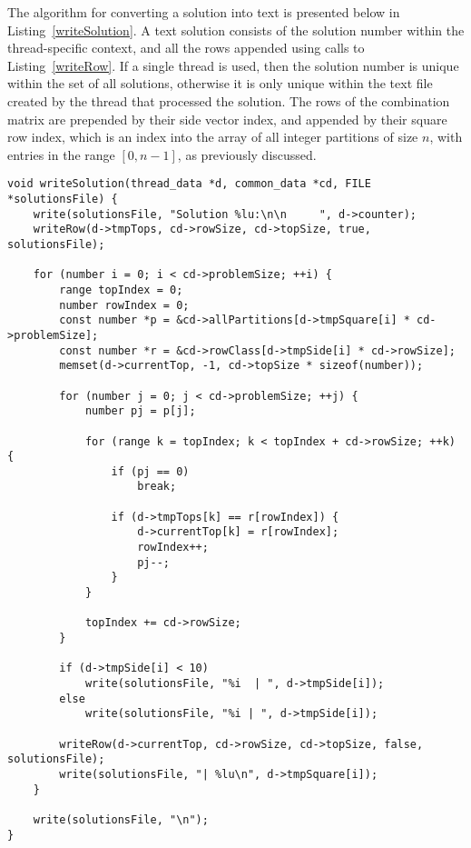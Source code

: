 The algorithm for converting a solution into text is presented below in Listing~\ref{writeSolution}. A text solution consists of the solution number within the thread-specific context, and all the rows appended using calls to Listing~\ref{writeRow}. If a single thread is used, then the solution number is unique within the set of all solutions, otherwise it is only unique within the text file created by the thread that processed the solution. The rows of the combination matrix are prepended by their side vector index, and appended by their square row index, which is an index into the array of all integer partitions of size $n$, with entries in the range $[0, n - 1]$, as previously discussed.

\begin{lstlisting}[caption={Writing an entire solution.},label={writeSolution}]
void writeSolution(thread_data *d, common_data *cd, FILE *solutionsFile) {
    write(solutionsFile, "Solution %lu:\n\n     ", d->counter);
    writeRow(d->tmpTops, cd->rowSize, cd->topSize, true, solutionsFile);

    for (number i = 0; i < cd->problemSize; ++i) {
        range topIndex = 0;
        number rowIndex = 0;
        const number *p = &cd->allPartitions[d->tmpSquare[i] * cd->problemSize];
        const number *r = &cd->rowClass[d->tmpSide[i] * cd->rowSize];
        memset(d->currentTop, -1, cd->topSize * sizeof(number));

        for (number j = 0; j < cd->problemSize; ++j) {
            number pj = p[j];

            for (range k = topIndex; k < topIndex + cd->rowSize; ++k) {
                if (pj == 0)
                    break;

                if (d->tmpTops[k] == r[rowIndex]) {
                    d->currentTop[k] = r[rowIndex];
                    rowIndex++;
                    pj--;
                }
            }

            topIndex += cd->rowSize;
        }

        if (d->tmpSide[i] < 10)
            write(solutionsFile, "%i  | ", d->tmpSide[i]);
        else
            write(solutionsFile, "%i | ", d->tmpSide[i]);

        writeRow(d->currentTop, cd->rowSize, cd->topSize, false, solutionsFile);
        write(solutionsFile, "| %lu\n", d->tmpSquare[i]);
    }

    write(solutionsFile, "\n");
}
\end{lstlisting}

